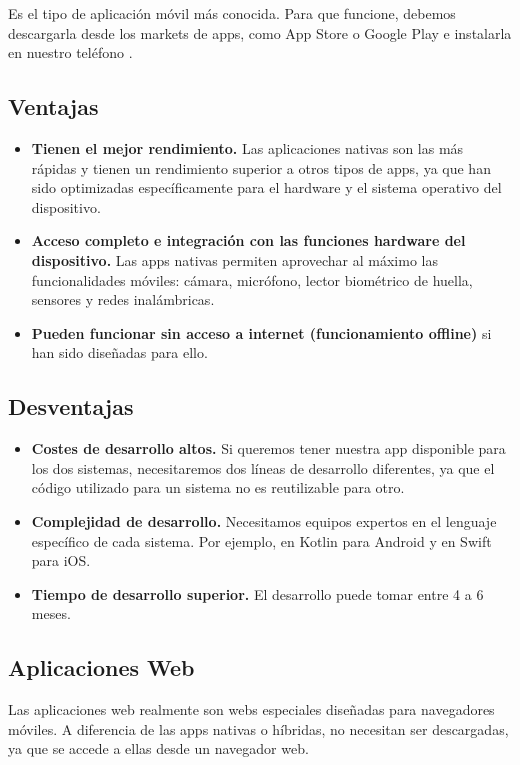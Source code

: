 Es el tipo de aplicación móvil más conocida. Para que funcione, debemos descargarla desde los markets de apps, como App Store o Google Play e instalarla en nuestro teléfono \cite{CitaA02}.

\subsection*{Ventajas}
\begin{itemize}
	\item \textbf{Tienen el mejor rendimiento.} Las aplicaciones nativas son las más rápidas y tienen un rendimiento superior a otros tipos de apps, ya que han sido optimizadas específicamente para el hardware y el sistema operativo del dispositivo.
	\item \textbf{Acceso completo e integración con las funciones hardware del dispositivo.} Las apps nativas permiten aprovechar al máximo las funcionalidades móviles: cámara, micrófono, lector biométrico de huella, sensores y redes inalámbricas.
	\item \textbf{Pueden funcionar sin acceso a internet (funcionamiento offline)} si han sido diseñadas para ello.
\end{itemize}

\subsection*{Desventajas}
\begin{itemize}
	\item \textbf{Costes de desarrollo altos.} Si queremos tener nuestra app disponible para los dos sistemas, necesitaremos dos líneas de desarrollo diferentes, ya que el código utilizado para un sistema no es reutilizable para otro.
	\item \textbf{Complejidad de desarrollo.} Necesitamos equipos expertos en el lenguaje específico de cada sistema. Por ejemplo, en Kotlin para Android y en Swift para iOS.
	\item \textbf{Tiempo de desarrollo superior.} El desarrollo puede tomar entre 4 a 6 meses.
\end{itemize}

\subsection{Aplicaciones Web}

Las aplicaciones web realmente son webs especiales diseñadas para navegadores móviles. A diferencia de las apps nativas o híbridas, no necesitan ser descargadas, ya que se accede a ellas desde un navegador web.

